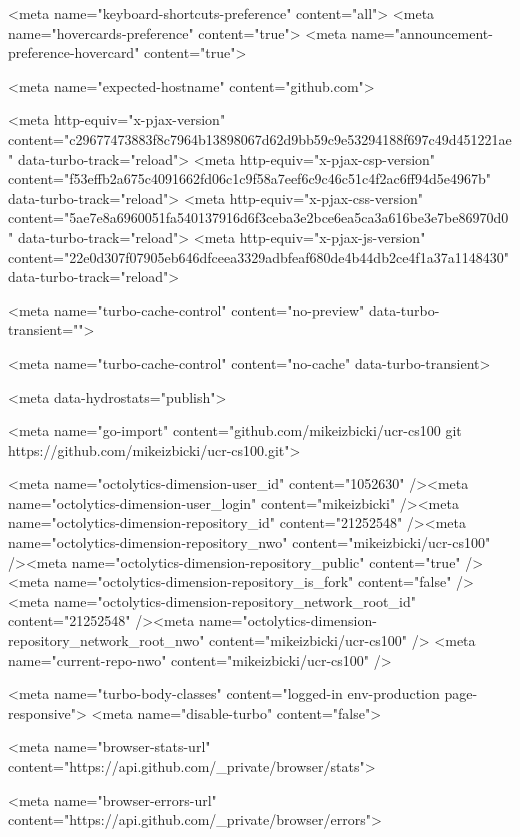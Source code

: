       <meta name="keyboard-shortcuts-preference" content="all">
      <meta name="hovercards-preference" content="true">
      <meta name="announcement-preference-hovercard" content="true">

        <meta name="expected-hostname" content="github.com">


  <meta http-equiv="x-pjax-version" content="c29677473883f8c7964b13898067d62d9bb59c9e53294188f697c49d451221ae" data-turbo-track="reload">
  <meta http-equiv="x-pjax-csp-version" content="f53effb2a675c4091662fd06c1c9f58a7eef6c9c46c51c4f2ac6ff94d5e4967b" data-turbo-track="reload">
  <meta http-equiv="x-pjax-css-version" content="5ae7e8a6960051fa540137916d6f3ceba3e2bce6ea5ca3a616be3e7be86970d0" data-turbo-track="reload">
  <meta http-equiv="x-pjax-js-version" content="22e0d307f07905eb646dfceea3329adbfeaf680de4b44db2ce4f1a37a1148430" data-turbo-track="reload">

  <meta name="turbo-cache-control" content="no-preview" data-turbo-transient="">

      <meta name="turbo-cache-control" content="no-cache" data-turbo-transient>

    <meta data-hydrostats="publish">

  <meta name="go-import" content="github.com/mikeizbicki/ucr-cs100 git https://github.com/mikeizbicki/ucr-cs100.git">

  <meta name="octolytics-dimension-user_id" content="1052630" /><meta name="octolytics-dimension-user_login" content="mikeizbicki" /><meta name="octolytics-dimension-repository_id" content="21252548" /><meta name="octolytics-dimension-repository_nwo" content="mikeizbicki/ucr-cs100" /><meta name="octolytics-dimension-repository_public" content="true" /><meta name="octolytics-dimension-repository_is_fork" content="false" /><meta name="octolytics-dimension-repository_network_root_id" content="21252548" /><meta name="octolytics-dimension-repository_network_root_nwo" content="mikeizbicki/ucr-cs100" />
  <meta name="current-repo-nwo" content="mikeizbicki/ucr-cs100" />



    

    <meta name="turbo-body-classes" content="logged-in env-production page-responsive">
  <meta name="disable-turbo" content="false">


  <meta name="browser-stats-url" content="https://api.github.com/_private/browser/stats">

  <meta name="browser-errors-url" content="https://api.github.com/_private/browser/errors">

